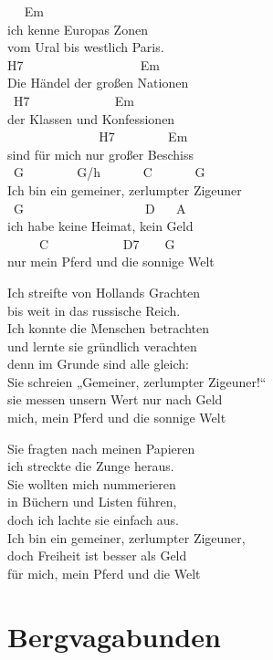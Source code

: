 \documentclass[
  letterpaper,
  twoside=false]{scrbook}
\begin{document}
~ ~Em\\
ich kenne Europas Zonen\\
vom Ural bis westlich Paris.\\
H7 ~ ~ ~ ~ ~ ~ ~ ~ ~ ~ ~Em\\
Die Händel der großen Nationen\\
\hspace*{0.333em} ~H7 ~ ~ ~ ~ ~ ~ ~ ~Em\\
der Klassen und Konfessionen\\
\hspace*{0.333em} ~ ~ ~ ~ ~ ~ ~ ~ ~H7 ~ ~ ~ ~ ~Em ~\\
sind für mich nur großer Beschiss\\
\hspace*{0.333em} ~G ~ ~ ~ ~ ~G/h ~ ~ ~ ~C ~ ~ ~ ~G\\
Ich bin ein gemeiner, zerlumpter Zigeuner\\
\hspace*{0.333em} ~G ~ ~ ~ ~ ~ ~ ~ ~ ~ ~ ~ D ~ ~A\\
ich habe keine Heimat, kein Geld\\
\hspace*{0.333em} ~ ~ ~ C ~ ~ ~ ~ ~ ~ ~D7 ~ ~ G\\
nur mein Pferd und die sonnige Welt

Ich streifte von Hollands Grachten\\
bis weit in das russische Reich.\\
Ich konnte die Menschen betrachten\\
und lernte sie gründlich verachten\\
denn im Grunde sind alle gleich:\\
Sie schreien „Gemeiner, zerlumpter Zigeuner!{}``\\
sie messen unsern Wert nur nach Geld\\
mich, mein Pferd und die sonnige Welt

Sie fragten nach meinen Papieren\\
ich streckte die Zunge heraus.\\
Sie wollten mich nummerieren\\
in Büchern und Listen führen,\\
doch ich lachte sie einfach aus.\\
Ich bin ein gemeiner, zerlumpter Zigeuner,\\
doch Freiheit ist besser als Geld\\
für mich, mein Pferd und die Welt

\hypertarget{bergvagabunden}{%
\chapter{Bergvagabunden}\label{bergvagabunden}}
\end{document}
